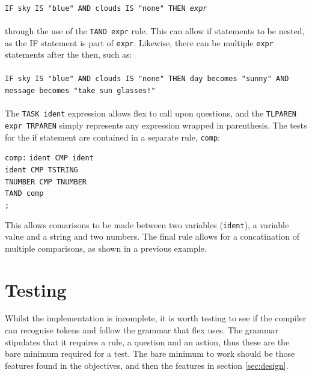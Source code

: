 \documentclass[12pt]{report}
\begin{document}
\\
\texttt{IF sky IS "blue" AND clouds IS "none" THEN \textit{expr}}\\
\\
through the use of the \texttt{TAND expr} rule.  This can allow if statements to be nested, as the IF statement is part of \texttt{expr}. Likewise, there can be multiple \texttt{expr} statements after the then, such as:\\
\\
\texttt{IF sky IS "blue" AND clouds IS "none" THEN day becomes "sunny" AND message becomes "take sun glasses!"}\\
\\
The \texttt{TASK ident} expression allows flex to call upon questions, and the \texttt{TLPAREN expr TRPAREN} simply represents any expression wrapped in parenthesis.
The tests for the if statement are contained in a separate rule, \texttt{comp}:\\
\begin{tabbing}
\texttt{comp:} \= \texttt{ident CMP ident}\\
\> \texttt{\textbar \space ident CMP TSTRING}\\
\> \texttt{\textbar \space TNUMBER CMP TNUMBER}\\
\> \texttt{\textbar \space TAND comp}\\
\> \texttt{;}\\
\end{tabbing}
This allows comarisons to be made between two variables (\texttt{ident}), a variable value and a string and two numbers.  The final rule allows for a concatination of multiple comparisons, as shown in a previous example.
\chapter{Testing}
Whilst the implementation is incomplete, it is worth testing to see if the compiler can recognise tokens and follow the grammar that flex uses.  The grammar stipulates that it requires a rule, a question and an action, thus these are the bare minimum required for a test.  The bare minimum to work should be those features found in the objectives, and then the features in section \ref{sec:design}.\\
\\
\end{document}
